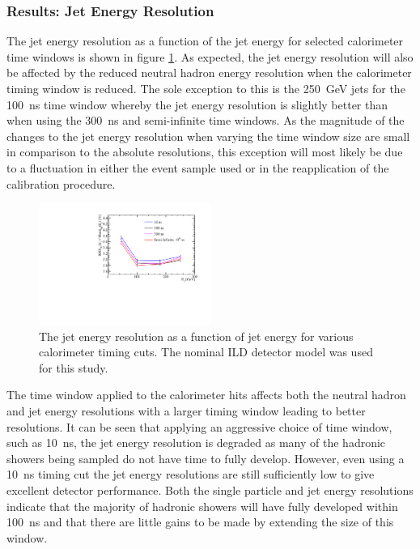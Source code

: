 
\subsubsection{Results: Jet Energy Resolution}
The jet energy resolution as a function of the jet energy for selected calorimeter time windows is shown in figure \ref{fig:jertimingcuts}.  As expected, the jet energy resolution will also be affected by the reduced neutral hadron energy resolution when the calorimeter timing window is reduced.  The sole exception to this is the 250~GeV jets for the 100~ns time window whereby the jet energy resolution is slightly better than when using the 300~ns and semi-infinite time windows.  As the magnitude of the changes to the jet energy resolution when varying the time window size are small in comparison to the absolute resolutions, this exception will most likely be due to a fluctuation in either the event sample used or in the reapplication of the calibration procedure.  

\begin{figure}[h!]
\includegraphics[width=0.5\textwidth]{EnergyEstimators/Plots/TimingCuts/JER_vs_JetEnergy_TimingCutStudies.pdf}
\caption[The jet energy resolution as a function of jet energy for various calorimeter timing cuts.  The results shown use the nominal ILD detector model.]{The jet energy resolution as a function of jet energy for various calorimeter timing cuts.  The nominal ILD detector model was used for this study.}
\label{fig:jertimingcuts}
\end{figure}

The time window applied to the calorimeter hits affects both the neutral hadron and jet energy resolutions with a larger timing window leading to better resolutions.  It can be seen that applying an aggressive choice of time window, such as 10~ns, the jet energy resolution is degraded as many of the hadronic showers being sampled do not have time to fully develop.  However, even using a 10~ns timing cut the jet energy resolutions are still sufficiently low to give excellent detector performance.  Both the single particle and jet energy resolutions indicate that the majority of hadronic showers will have fully developed within 100~ns and that there are little gains to be made by extending the size of this window.  

